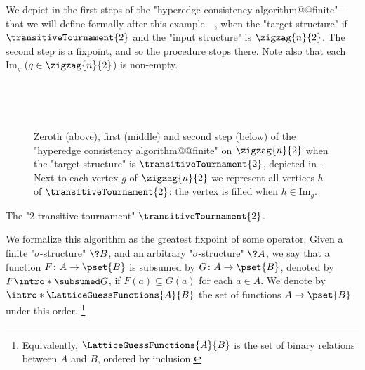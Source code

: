 \begin{example}
	\AP\label{ex:zigzag-HC-T2}
	We depict in  the first steps of the "hyperedge consistency algorithm@@finite"---that we will define formally after this example---, when the "target structure"
	if $\transitiveTournament{2}$ and the "input structure" is $\zigzag{n}{2}$.
	The second step is a fixpoint, and so the procedure stops there. Note also that
	each $\textrm{Im}_g$ ($g\in \zigzag{n}{2}$) is non-empty. 
\end{example}

\begin{figure}
	\centering
	\begin{tikzpicture}
		
		
	\end{tikzpicture}\\[2em]
	\begin{tikzpicture}
		
		
	\end{tikzpicture}\\[2em]
	\begin{tikzpicture}
		
		
	\end{tikzpicture}
	\caption{\AP\label{fig:zigzag-graph-HC-T2} Zeroth (above), first (middle) and second step (below) of the "hyperedge consistency algorithm@@finite" on $\zigzag{n}{2}$
	when the "target structure" is $\transitiveTournament{2}$, depicted in . Next to each vertex $g$ of $\zigzag{n}{2}$ we represent
	all vertices $h$ of $\transitiveTournament{2}$: the vertex is filled
	when $h \in \textrm{Im}_{g}$.
	}
\end{figure}
\begin{marginfigure}[-15.5em]
	\centering
	\begin{tikzpicture}
		
	\end{tikzpicture}
	\caption{
		\AP\label{fig:zigzag-graph-HC-T2-side-T2}
		The "$2$-transitive tournament" $\transitiveTournament{2}$.
	}
\end{marginfigure}

We formalize this algorithm as the greatest fixpoint of some operator.
Given a finite "$\sigma$-structure" $\?B$, and an arbitrary%
"$\sigma$-structure" $\?A$, we say that a function $F\colon A \to \pset{B}$ is subsumed
by $G\colon A \to \pset{B}$, denoted by \AP\(F \intro*\subsumed G\),
if $F(a) \subseteq G(a)$ for each $a \in A$. We denote by
\AP\(\intro*\LatticeGuessFunctions{A}{B}\) the set of functions $A \to \pset{B}$ under this order.%
\footnote{Equivalently, $\LatticeGuessFunctions{A}{B}$ is the
set of binary relations between $A$ and $B$, ordered by inclusion.}

